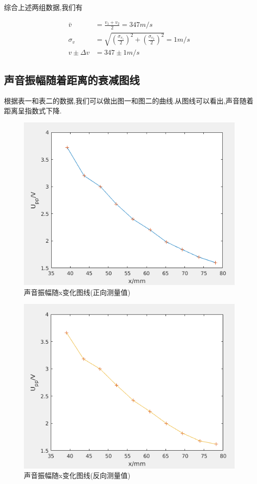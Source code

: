 \documentclass[a4paper,10pt,notitlepage]{article}
\begin{document}
	综合上述两组数据,我们有
	
\begin{align}
	\bar{v} &= \frac{v_1 + v_2}{2} = 347 m/s \\
	\sigma_v &= \sqrt{(\frac{\sigma_{v_1}}{2})^2 + (\frac{\sigma_{v_2}}{2})^2} = 1 m/s \\
	v \pm \Delta v &= 347 \pm 1 m/s
\end{align}

\subsection{声音振幅随着距离的衰减图线}

	根据表一和表二的数据,我们可以做出图一和图二的曲线.从图线可以看出,声音随着距离呈指数式下降.
	
\begin{figure}[h]
	\includegraphics[scale=.6]{f1.png}
	\caption{声音振幅随x变化图线(正向测量值)}
\end{figure}
\begin{figure}[h]
	\includegraphics[scale=.6]{f2.png}
	\caption{声音振幅随x变化图线(反向测量值)}
\end{figure}
\end{document}
